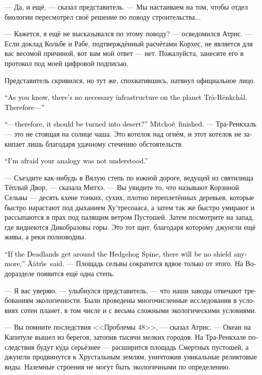 \documentclass[a4paper,12pt,fleqn]{book}\usepackage{cooltooltips}\usepackage{polyglossia}\setdefaultlanguage[babelshorthands=true]{russian}\setotherlanguage{english}\defaultfontfeatures{Ligatures=TeX,Mapping=tex-text} \usepackage{xcolor}\definecolor{lightgray}{HTML}{bbbbbb}\color{lightgray}\newcommand{\ml}[3]{\textenglish{\textcolor{black}{#3}}}
\newcommand{\Aatris}{\"{A}\={a}tr\v{\i}s}
\newcommand{\Mitchoe}{M\={\i}tcho\^{e}}
\begin{document}
{--- Да, и ещё, --- сказал представитель.
--- Мы настаиваем на том, чтобы отдел биологии пересмотрел своё решение по поводу строительства...

--- Кажется, я ещё не высказывался по этому поводу? --- осведомился Атрис.
--- Если доклад Кольбе и Рабе, подтверждённый расчётами Корхес, не является для вас весомой причиной, вот вам мой ответ --- нет.
Пожалуйста, занесите его в протокол под моей цифровой подписью.

Представитель скривился, но тут же, спохватившись, натянул официальное лицо.

\ml{$0-[ej]$}
{--- Как вы знаете, планета Тра-Ренкхаль не обладает необходимой инфраструктурой.}
{``As you know, there's no necessary infrastructure on the planet Tr\r{a}-R\={e}nkch\'{a}l.}
\ml{$0-[ej]$}
{Поэтому...}
{Therefore---''}

\ml{$0-[ej]$}
{---  ... и поэтому её нужно превратить в пустыню? --- закончила Митхэ.}
{``---therefore, it should be turned into desert?'' \Mitchoe\ finished.}
--- Тра-Ренкхаль --- это не стоящая на солнце чаша.
Это котелок над огнём, и этот котелок не закипает лишь благодаря удачному стечению обстоятельств.

\ml{$0-[ej]$}
{--- Боюсь, я не совсем понимаю вашу аналогию.}
{``I'm afraid your analogy was not understood.''}

--- Съездите как-нибудь в Вялую степь по южной дороге, ведущей из святилища Тёплый Двор, --- сказала Митхэ.
--- Вы увидите то, что называют Корзиной Сельвы --- десять кхене тонких, сухих, плотно переплетённых деревьев, которые быстро нарастают под дыханием Ху'тресоааса, а затем так же быстро умирают и рассыпаются в прах под палящим ветром Пустошей.
Затем посмотрите на запад, где виднеются Дикобразовы горы.
Это тот щит, благодаря которому джунгли ещё живы, а реки полноводны.

\ml{$0-[ej]$}
{--- Если Пустоши обогнут Хребет Дикобраза, он перестанет быть защитой, --- сказал Атрис.}
{``If the Deadlands get around the Hedgehog Spine, there will be no shield anymore,'' \Aatris\ said.}
--- Площадь сельвы сократится вдвое только от этого.
На Водоразделе появится ещё одна степь.

--- Я вас уверяю, --- улыбнулся представитель, --- что наши заводы отвечают требованиям экологичности.
Были проведены многочисленные исследования в условиях сотен планет, в том числе и с весьма сложными экологическими условиями.

--- Вы помните последствия <<Проблемы 48>>, --- сказал Атрис.
--- Океан на Капитуле вышел из берегов, затопив тысячи мелких городов.
На Тра-Ренкхале последствия будут куда серьёзнее --- расширится площадь Смертных пустошей, а джунгли продвинутся к Хрустальным землям, уничтожив уникальные реликтовые виды.
Наземные строения не могут быть экологичными по определению.

}
\end{document}
